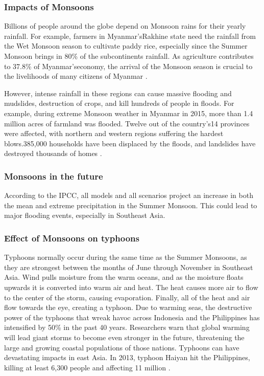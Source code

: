 \subsubsection{Impacts of Monsoons}

Billions of people around the globe depend on Monsoon rains for their yearly rainfall. For example, farmers in Myanmar'sRakhine state need the rainfall from the Wet Monsoon season to cultivate paddy rice, especially since the Summer Monsoon brings in 80\% of the subcontinents rainfall. As agriculture contributes to 37.8\% of Myanmar'seconomy, the arrival of the Monsoon season is crucial to the livelihoods of many citizens of Myanmar \citep{monsoonimpact}.

However, intense rainfall in these regions can cause massive flooding and mudslides, destruction of crops, and kill hundreds of people in floods. For example, during extreme Monsoon weather in Myanmar in 2015,  more than 1.4 million acres of farmland was flooded. Twelve out of the country's14 provinces were affected, with northern and western regions suffering the hardest blows.385,000 households have been displaced by the floods, and landslides have destroyed thousands of homes \citep{monsoonimpact}.

\subsubsection{Monsoons in the future}
According to the IPCC, all models and all scenarios project an increase in both the mean and extreme precipitation in the Summer Monsoon. This could lead to major flooding events, especially in Southeast Asia.\citep{monsoonfuture}

\subsubsection{Effect of Monsoons on typhoons}
Typhoons normally occur during the same time as the Summer Monsoons, as they are strongest between the months of June through November in Southeast Asia. Wind pulls moisture from the warm oceans, and as the moisture floats upwards it is converted into warm air and heat. The heat causes more air to flow to the center of the storm, causing evaporation. Finally, all of the heat and air flow towards the eye, creating a typhoon. Due to warming seas, the destructive power of the typhoons that wreak havoc across Indonesia and the Philippines has intensified by 50\% in the past 40 years. Researchers warn that global warming will lead giant storms to become even stronger in the future, threatening the large and growing coastal populations of those nations. Typhoons can have devastating impacts in east Asia. In 2013, typhoon Haiyan hit the Philippines, killing at least 6,300 people and affecting 11 million \citep{typhoon}.

